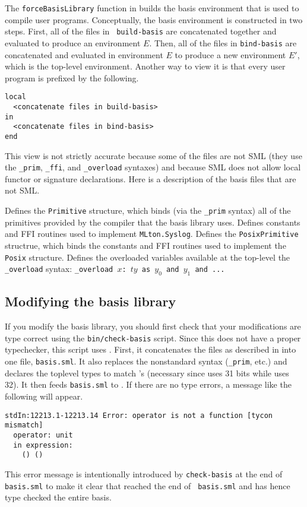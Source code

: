The {\tt forceBasisLibrary} function in  builds
the basis environment that is used to compile user programs.  Conceptually, the
basis environment is constructed in two steps.  First, all of the files in {\tt
build-basis} are concatenated together and evaluated to produce an environment
$E$.  Then, all of the files in {\tt bind-basis} are concatenated and evaluated
in environment $E$ to produce a new environment $E'$, which is the top-level
environment.  Another way to view it is that every user program is prefixed by
the following.
\begin{verbatim}
local
  <concatenate files in build-basis>
in
  <concatenate files in bind-basis>
end
\end{verbatim}
This view is not strictly accurate because some of the files are not SML (they
use the {\tt \_prim}, {\tt \_ffi}, and {\tt \_overload} syntaxes) and because SML
does not allow local functor or signature declarations.  Here is a description
of the basis files that are not SML.
\begin{description}
Defines the {\tt Primitive} structure, which binds (via the {\tt \_prim}
syntax) all of the primitives provided by the compiler that the basis library
uses.
Defines constants and FFI routines used to implement {\tt MLton.Syslog}.
Defines the {\tt PosixPrimitive} structrue, which binds the constants and FFI
routines used to implement the {\tt Posix} structure.
Defines the overloaded variables available at the top-level the {\tt \_overload}
syntax: {\tt \_overload $x$: $ty$ as $y_0$ and $y_1$ and ...}
\end{description}

\subsection{Modifying the basis library}

If you modify the basis library, you should first check that your modifications
are type correct using the {\tt bin/check-basis} script.  Since this {\mlton}
does not have a proper typechecker, this script uses {\smlnj}.  First, it
concatenates the files as described in  into one file,
{\tt basis.sml}.  It also replaces the nonstandard syntax ({\tt \_prim}, etc.) 
and declares the toplevel types to match {\mlton}'s (necessary since {\smlnj}
uses 31 bits while {\mlton} uses 32).  It then feeds {\tt basis.sml} to
{\smlnj}.  If there are no type errors, a message like the following will
appear.
\begin{verbatim}
stdIn:12213.1-12213.14 Error: operator is not a function [tycon mismatch]
  operator: unit
  in expression:
    () ()
\end{verbatim}
This error message is intentionally introduced by {\tt check-basis} at the end
of {\tt basis.sml} to make it clear that {\smlnj} reached the end of {\tt
basis.sml} and has hence type checked the entire basis.

